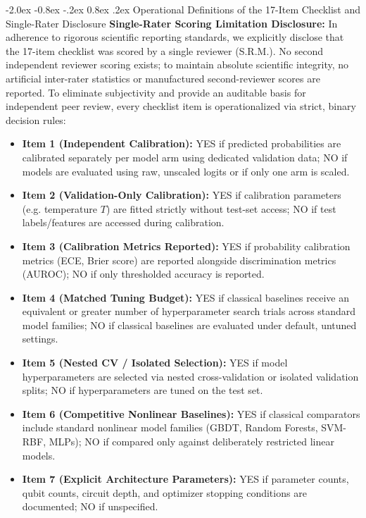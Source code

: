 \documentclass[10pt,a4paper]{article}
\makeatletter
\renewcommand{\subsection}{\@startsection{subsection}{2}{\z@}%
  {-2.0ex \@plus -0.8ex \@minus -.2ex}%
  {0.8ex \@plus.2ex}%
  {\normalfont\large\sffamily\bfseries\color{naturedark}}}
\makeatother
\begin{document}
\subsection{Operational Definitions of the 17-Item Checklist and Single-Rater Disclosure}
\noindent\textbf{Single-Rater Scoring Limitation Disclosure:} In adherence to rigorous scientific reporting standards, we explicitly disclose that the 17-item checklist was scored by a single reviewer (S.R.M.). No second independent reviewer scoring exists; to maintain absolute scientific integrity, no artificial inter-rater statistics or manufactured second-reviewer scores are reported. To eliminate subjectivity and provide an auditable basis for independent peer review, every checklist item is operationalized via strict, binary decision rules:
\begin{itemize}
  \setlength{\itemsep}{1pt}
  \item \textbf{Item 1 (Independent Calibration):} YES if predicted probabilities are calibrated separately per model arm using dedicated validation data; NO if models are evaluated using raw, unscaled logits or if only one arm is scaled.
  \item \textbf{Item 2 (Validation-Only Calibration):} YES if calibration parameters (e.g. temperature $T$) are fitted strictly without test-set access; NO if test labels/features are accessed during calibration.
  \item \textbf{Item 3 (Calibration Metrics Reported):} YES if probability calibration metrics (ECE, Brier score) are reported alongside discrimination metrics (AUROC); NO if only thresholded accuracy is reported.
  \item \textbf{Item 4 (Matched Tuning Budget):} YES if classical baselines receive an equivalent or greater number of hyperparameter search trials across standard model families; NO if classical baselines are evaluated under default, untuned settings.
  \item \textbf{Item 5 (Nested CV / Isolated Selection):} YES if model hyperparameters are selected via nested cross-validation or isolated validation splits; NO if hyperparameters are tuned on the test set.
  \item \textbf{Item 6 (Competitive Nonlinear Baselines):} YES if classical comparators include standard nonlinear model families (GBDT, Random Forests, SVM-RBF, MLPs); NO if compared only against deliberately restricted linear models.
  \item \textbf{Item 7 (Explicit Architecture Parameters):} YES if parameter counts, qubit counts, circuit depth, and optimizer stopping conditions are documented; NO if unspecified.

\end{itemize}
\end{document}
